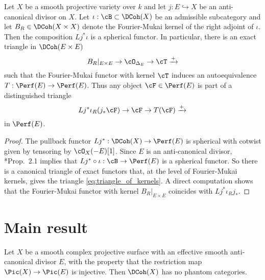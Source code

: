 \begin{thm} \label{C:triangle_on_anticanonical} Let $X$ be a smooth projective variety over $k$ and let $j: E \hookrightarrow X$ be an anti-canonical divisor on $X$. Let $\iota: \cB \subset \DCoh(X)$ be an admissible subcategory and let $B_R \in \DCoh(X\times X)$ denote the Fourier-Mukai kernel of the right adjoint of $\iota$. Then the composition $Lj^\ast \iota$ is a spherical functor. In particular, there is an exact triangle in $\DCoh(E\times E)$
\begin{equation}
    B_R\vert_{E\times E} \to \cO_{\Delta_E} \to \cT  \xrightarrow{+   }  \label{eq:triangle_of_kernels}
\end{equation}
such that the Fourier-Mukai functor with kernel $\cT$ induces an autoequivalence $T: \Perf(E) \to \Perf(E)$. Thus any object $\cF \in \Perf(E)$ is part of a distinguished triangle 
\begin{equation}
    Lj^\ast \iota_R (j_\ast \cF) \to \cF \to T(\cF)  \xrightarrow{+   } \label{eq:triangle_on_anticanonical_div}
\end{equation}
in $\Perf(E)$.
\end{thm} 

\begin{proof}
The pullback functor $Lj^\ast: \DCoh(X) \to \Perf(E)$ is spherical with cotwist given by tensoring by $\cO_X(-E)[1]$. Since $E$ is an anti-canonical divisor, 
\cite{A16}*{Prop.~2.1} implies that $Lj^\ast \circ \iota: \cB \to \Perf(E)$ is a spherical functor. So there is a canonical triangle of exact functors that, at the level of Fourier-Mukai kernels, gives the triangle \eqref{eq:triangle_of_kernels}. A direct computation shows that the Fourier-Mukai functor with kernel $B_R\vert_{E\times E}$ coincides with $Lj^\ast \iota_R j_\ast$.
\end{proof}


\section{Main result} \label{S:proof}

\begin{thm}\label{T:main_theorem}
    Let $X$ be a smooth complex projective surface with an effective smooth anti-canonical divisor $E$, with the property that the restriction map $\Pic(X)\to \Pic(E)$ is injective. Then $\DCoh(X)$ has no phantom categories. 
\end{thm}


